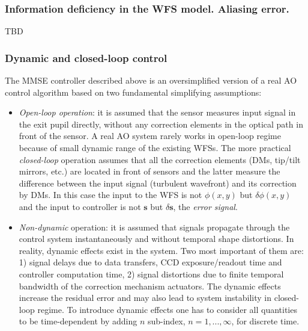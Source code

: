 \subsubsection{Information deficiency in the WFS model. Aliasing error.}

TBD

\subsubsection{Dynamic and closed-loop control}

The MMSE controller described above is an oversimplified version of a real AO
control algorithm based on two fundamental simplifying assumptions:
\begin{itemize}
	\item \emph{Open-loop operation}:  it is assumed
	that the sensor measures input signal in the exit pupil directly,
	without any correction elements in the optical path in front of the sensor.
	A real AO system rarely works in open-loop regime because of small dynamic
	range of the existing WFSs. The more practical \emph{closed-loop} operation
	assumes that all the correction elements (DMs, tip/tilt mirrors, etc.) are
	located in front of sensors and the latter measure the difference between
	the input signal (turbulent wavefront) and its correction by DMs. In this
	case the input to the WFS is not $\phi(x,y)$ but $\delta \phi(x,y)$ and the
	input to
	controller is not $\bm{s}$ but $\delta \bm{s}$, the \emph{error signal}.
  \item \emph{Non-dynamic} operation:  it is
  assumed that signals propagate through the control system instantaneously
  and without temporal shape distortions. In reality, dynamic effects exist in
  the system. Two most important of them are: 1) signal delays due to
  data transfers, CCD exposure/readout time and controller computation time,
  2) signal distortions due to finite temporal bandwidth of the correction
  mechanism actuators. The dynamic effects increase the residual error and may
  also lead to system instability in closed-loop regime. To introduce dynamic
  effects one has to consider all quantities to be time-dependent by adding
  $n$ sub-index, $n=1,...,\infty$, for discrete time.
\end{itemize}

